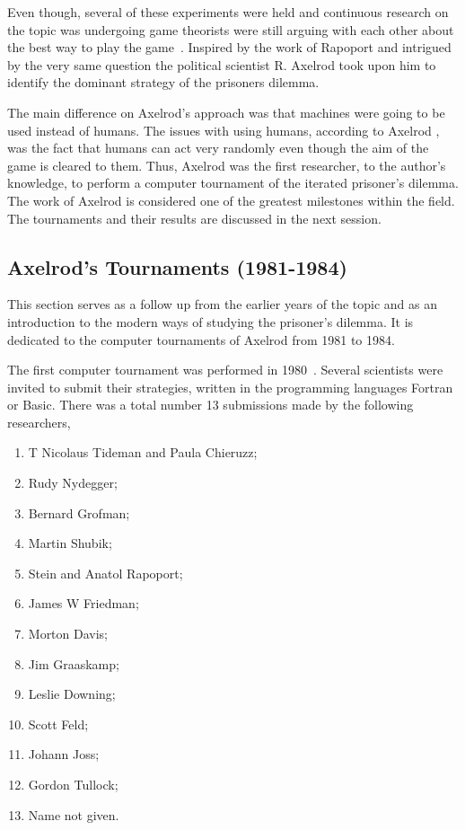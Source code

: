 \documentclass{article}
\begin{document}
Even though, several of these experiments were held and continuous research on
the topic was undergoing game theorists were still arguing with each other about
the best way to play the game~\cite{rapoport1965}. Inspired by the work of
Rapoport and intrigued by the very same question the political scientist R. 
Axelrod took upon him to identify the dominant strategy of the prisoners dilemma.
 
The main difference on Axelrod's approach was that machines were going to be used 
instead of humans. The issues with using humans, according to Axelrod
\cite{Axelrod2012}, was the fact that humans can act very randomly even though
the aim of the game is cleared to them. Thus, Axelrod was the first researcher,
to the author's knowledge, to perform a computer tournament of the iterated
prisoner's dilemma. The work of Axelrod is considered one of the greatest
milestones within the field. The tournaments and their results are discussed in
the next session.

\subsection{Axelrod's Tournaments (1981-1984)}\label{subsection:axelrods_tournament}

This section serves as a follow up from the earlier years of the topic and as an
introduction to the modern ways of studying the prisoner's dilemma. It is 
dedicated to the computer tournaments of Axelrod from 1981 to 1984. 

The first computer tournament was performed in 1980~\cite{Axelrod1980a}.
Several scientists were invited to submit their strategies, written in the
programming languages Fortran or Basic. There was a total number 13 submissions
made by the following researchers,

\begin{multicols}{2}
    \begin{enumerate}
        \item T Nicolaus Tideman and Paula Chieruzz;
        \item Rudy Nydegger;
        \item Bernard Grofman;
        \item Martin Shubik;
        \item Stein and Anatol Rapoport;
        \item James W Friedman;
        \item Morton Davis;
        \item Jim Graaskamp;
        \item Leslie Downing;
        \item Scott Feld;
        \item Johann Joss;
        \item Gordon Tullock;
        \item Name not given.
    \end{enumerate}
\end{multicols}
\end{document}
